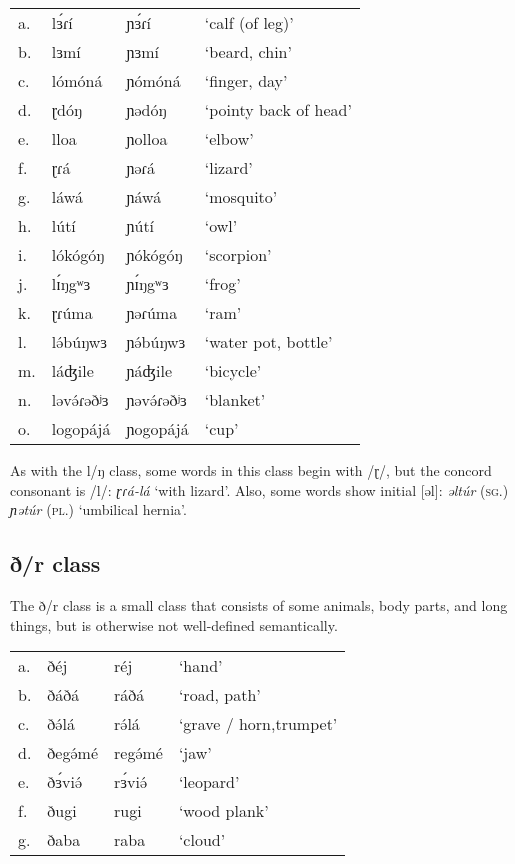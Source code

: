 \ea
\begin{tabular}[t]{llll}
a.	&	lɜ́ɾí	&	ɲɜ́ɾí	&	‘calf (of leg)’\\
b.	&	lɜmí	&	ɲɜmí	&	‘beard, chin’\\
c.	&	lómóná	&	ɲómóná	&	‘finger, day’\\
d.	&	ɽdóŋ	&	ɲədóŋ	&	‘pointy back of head’\\
e.	&	lloa	&	ɲolloa	&	‘elbow’\\
f.	&	ɽɾá		&	ɲəɾá	&	‘lizard’\\
g.	&	láwá	&	ɲáwá	&	‘mosquito’\\
h.	&	lútí	&	ɲútí	&	‘owl’\\
i.	&	lókógóŋ	&	ɲókógóŋ	&	‘scorpion’\\
j.	&	lɪ́ŋgʷɜ	&	ɲɪ́ŋgʷɜ	&	‘frog’\\
k.	&	ɽɾúma	&	ɲəɾúma	&	‘ram’\\
l.	&	lə́búŋwɜ	&	ɲə́búŋwɜ	&	‘water pot, bottle’\\
m.	&	láʤile	&	ɲáʤile	&	‘bicycle’\\
n.	&	ləvə́ɾəðʲɜ&	ɲəvə́ɾəðʲɜ&	‘blanket’\\
o.	&	logopájá&	ɲogopájá&	‘cup’\\
\end{tabular}
\z

As with the l/ŋ class, some words in this class begin with /ɽ/, but the concord consonant is /l/: \textit{ɽɾá-lá} ‘with lizard’. Also, some words show initial [əl]: \textit{əltúr} (\textsc{sg}.) \textit{ɲətúr} (\textsc{pl}.) ‘umbilical hernia’.
		

\subsection{ð/r class}
The ð/r class is a small class that consists of some animals, body parts, and long things, but is otherwise not well-defined semantically. 

\ea
\begin{tabular}[t]{llll}
a.	&	ðéj		&	réj		&	‘hand’\\
b.	&	ðáðá	&	ráðá		&	‘road, path’\\
c.	&	ðə́lá		&	rə́lá		&	‘grave / horn,trumpet’\\
d.	&	ðegə́mé	&	regə́mé	&	‘jaw’\\
e.	&	ðɜ́viə́	&	rɜ́viə́	&	‘leopard’\\
f.	&	ðugi	&	rugi		&	‘wood plank’\\
g.	&	ðaba	&	raba		&	‘cloud’\\
\end{tabular}
\z

